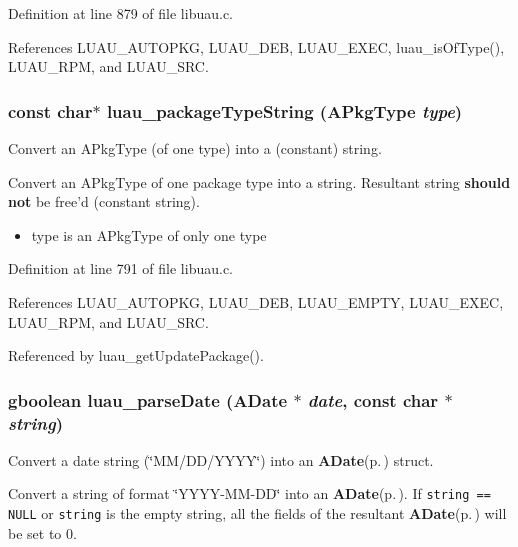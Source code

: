 Definition at line 879 of file libuau.c.

References LUAU\_\-AUTOPKG, LUAU\_\-DEB, LUAU\_\-EXEC, luau\_\-is\-Of\-Type(), LUAU\_\-RPM, and LUAU\_\-SRC.
\subsubsection{\setlength{\rightskip}{0pt plus 5cm}const char$\ast$ luau\_\-package\-Type\-String ({\bf APkg\-Type} {\em type})}\label{libuau_8h_a64}


Convert an APkg\-Type (of one type) into a (constant) string. 

Convert an APkg\-Type of one package type into a string. Resultant string {\bf should not} be free'd (constant string).

\begin{itemize}
\item type is an APkg\-Type of only one type 
\end{itemize}


Definition at line 791 of file libuau.c.

References LUAU\_\-AUTOPKG, LUAU\_\-DEB, LUAU\_\-EMPTY, LUAU\_\-EXEC, LUAU\_\-RPM, and LUAU\_\-SRC.

Referenced by luau\_\-get\-Update\-Package().
\subsubsection{\setlength{\rightskip}{0pt plus 5cm}gboolean luau\_\-parse\-Date ({\bf ADate} $\ast$ {\em date}, const char $\ast$ {\em string})}\label{libuau_8h_a69}


Convert a date string (\char`\"{}MM/DD/YYYY\char`\"{}) into an {\bf ADate}{\rm (p.\,\pageref{structADate})} struct. 

Convert a string of format \char`\"{}YYYY-MM-DD\char`\"{} into an {\bf ADate}{\rm (p.\,\pageref{structADate})}. If {\tt string == NULL} or {\tt string} is the empty string, all the fields of the resultant {\bf ADate}{\rm (p.\,\pageref{structADate})} will be set to 0.

